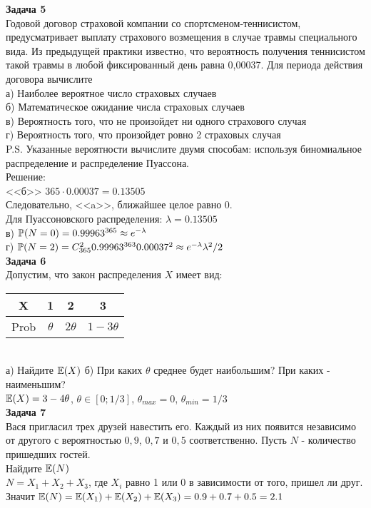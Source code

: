 \documentclass[pdftex,12pt,a4paper]{article}
\begin{document}
\textbf{Задача 5} \\ %
Годовой договор страховой компании со спортсменом-теннисистом, предусматривает выплату страхового возмещения  в случае травмы специального вида. Из предыдущей практики известно, что вероятность получения теннисистом такой травмы  в любой фиксированный день равна 0,00037. Для периода действия договора вычислите \\
а) Наиболее вероятное число страховых случаев  \\
б) Математическое ожидание числа страховых случаев \\
в) Вероятность того, что не произойдет ни одного страхового случая \\
г) Вероятность того, что произойдет ровно 2 страховых случая \\
P.S. Указанные вероятности вычислите двумя способам: используя биномиальное распределение и распределение Пуассона.\\
Решение: \\
<<б>> $365\cdot 0.00037=0.13505$ \\
Следовательно, <<a>>, ближайшее целое равно 0. \\
Для Пуассоновского распределения: $\lambda=0.13505$ \\
в) $\P(N=0)=0.99963^{365}\approx e^{-\lambda}$ \\
г) $\P(N=2)=C_{365}^{2}0.99963^{363}0.00037^{2}\approx e^{-\lambda}\lambda^{2}/2$ \\


\textbf{Задача 6} \\ %
Допустим, что закон распределения $X$ имеет вид:
\begin{tabular}{|c|c|c|c|}
  \hline
  X & 1 & 2 & 3 \\
  \hline
  Prob & $\theta$ & $2\theta$ & $1-3\theta$ \\
  \hline
\end{tabular} \\
а) Найдите $\E(X)$ %
б) При каких $\theta$ среднее будет наибольшим? При каких - наименьшим? \\
$\E(X)=3-4\theta$, $\theta\in[0;1/3]$, $\theta_{max}=0$, $\theta_{min}=1/3$ \\


\textbf{Задача 7} \\ %
Вася пригласил трех друзей навестить его. Каждый из них появится
независимо от другого с вероятностью $0,9$, $0,7$ и $0,5$
соответственно. Пусть $N$ - количество пришедших гостей. \\
Найдите $\E(N)$ \\
$N=X_{1}+X_{2}+X_{3}$, где $X_{i}$ равно 1 или 0 в зависимости от того, пришел ли друг. Значит $\E(N)=\E(X_{1})+\E(X_{2})+\E(X_{3})=0.9+0.7+0.5=2.1$ \\
\end{document}
